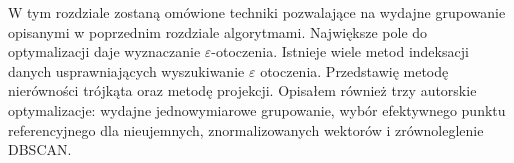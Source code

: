 W tym rozdziale zostaną omówione techniki pozwalające na wydajne grupowanie opisanymi w poprzednim rozdziale algorytmami. Największe pole do optymalizacji daje wyznaczanie $ \varepsilon $-otoczenia. Istnieje wiele metod indeksacji danych usprawniających wyszukiwanie $ \varepsilon $ otoczenia. Przedstawię metodę nierówności trójkąta oraz metodę projekcji. Opisałem również trzy autorskie optymalizacje: wydajne jednowymiarowe grupowanie, wybór efektywnego punktu referencyjnego dla nieujemnych, znormalizowanych wektorów i zrównoleglenie DBSCAN.